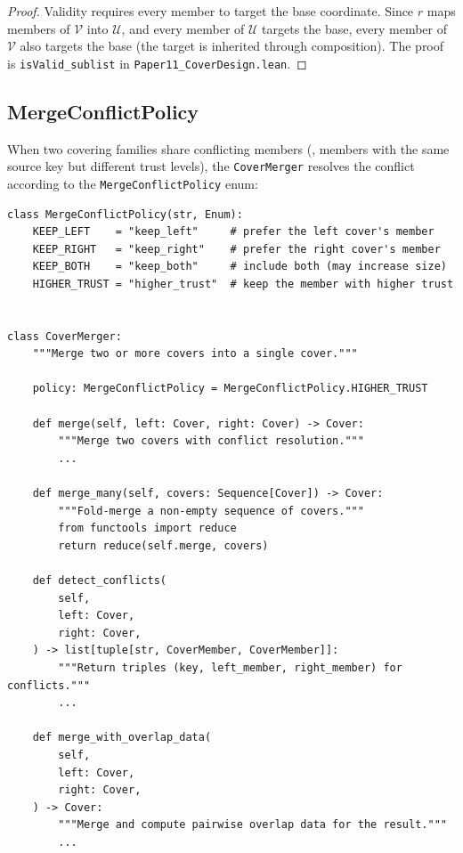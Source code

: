 \documentclass[11pt]{article}
\begin{document}
\begin{proof}
Validity requires every member to target the base coordinate.
Since $r$ maps members of $\mathcal{V}$ into $\mathcal{U}$, and
every member of $\mathcal{U}$ targets the base, every member of
$\mathcal{V}$ also targets the base (the target is inherited through
composition).
The \LEAN{} proof is \texttt{isValid\_sublist} in
\texttt{Paper11\_CoverDesign.lean}.
\end{proof}

\subsection{MergeConflictPolicy}

When two covering families share conflicting members (\ie, members
with the same source key but different trust levels), the
\texttt{CoverMerger} resolves the conflict according to the
\texttt{MergeConflictPolicy} enum:

\begin{lstlisting}[style=jugeo-python,
  caption={\texttt{MergeConflictPolicy} and \texttt{CoverMerger}.},
  label={lst:merger}]
class MergeConflictPolicy(str, Enum):
    KEEP_LEFT    = "keep_left"     # prefer the left cover's member
    KEEP_RIGHT   = "keep_right"    # prefer the right cover's member
    KEEP_BOTH    = "keep_both"     # include both (may increase size)
    HIGHER_TRUST = "higher_trust"  # keep the member with higher trust


class CoverMerger:
    """Merge two or more covers into a single cover."""

    policy: MergeConflictPolicy = MergeConflictPolicy.HIGHER_TRUST

    def merge(self, left: Cover, right: Cover) -> Cover:
        """Merge two covers with conflict resolution."""
        ...

    def merge_many(self, covers: Sequence[Cover]) -> Cover:
        """Fold-merge a non-empty sequence of covers."""
        from functools import reduce
        return reduce(self.merge, covers)

    def detect_conflicts(
        self,
        left: Cover,
        right: Cover,
    ) -> list[tuple[str, CoverMember, CoverMember]]:
        """Return triples (key, left_member, right_member) for conflicts."""
        ...

    def merge_with_overlap_data(
        self,
        left: Cover,
        right: Cover,
    ) -> Cover:
        """Merge and compute pairwise overlap data for the result."""
        ...
\end{lstlisting}
\end{document}
